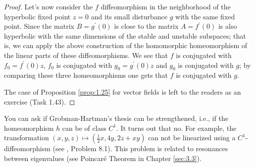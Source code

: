 \begin{proposition}
\begin{proof}
	Let's now consider the $ f $ diffeomorphism in the neighborhood of the hyperbolic fixed point $ z = 0 $ and its small disturbance $ g $ with the same fixed point. Since the matrix $B=g^{\prime }(0)$ is close to the matrix $ A = f ^ {\prime} (0) $ is also hyperbolic with the same dimensions of the stable and unstable subspaces; that is, we can apply the above construction of the homomorphic homeomorphism of the linear parts of these diffeomorphisms. We see that $ f $ is conjugated with $ f_ {0} = f ^ {\prime} (0)z $, $ f_ {0} $ is conjugated with $ g_ {0} = g ^ { \prime} (0) z $ and $ g_ {0} $ is conjugated with $ g $; by comparing these three homeomorphisms one gets that $ f $ is conjugated with $ g $.
	
	The case of Proposition \ref{prop:1.25} for vector fields is left to the readers as an exercise (Task 1.43).
	\end{proof}
\end{proposition}

\begin{remark}
	You can ask if Grobman-Hartman's thesis can be strengthened, i.e., if the homeomorphism $ h $ can be of class $ C ^ {1} $. It turns out that no. For example, the transformation $ \left (x, y, z \right) \longmapsto \left (\frac {1} {2} x, 4y, 2z + xy \right) $ can not be linearized using a  $C ^ {1} $-diffeomorphism   (see \cite {Hart}, Problem 8.1). This problem is related to resonances between eigenvalues (see Poincaré Theorem in Chapter \ref{sec:3.3}).
\end{remark}

